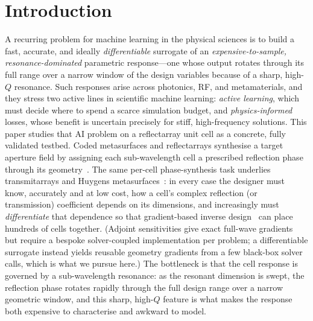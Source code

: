 \documentclass[11pt]{article}
\begin{document}
\section{Introduction}
A recurring problem for machine learning in the physical sciences is to build a fast, accurate, and
ideally \emph{differentiable} surrogate of an \emph{expensive-to-sample, resonance-dominated} parametric
response---one whose output rotates through its full range over a narrow window of the design variables
because of a sharp, high-$Q$ resonance. Such responses arise across photonics, RF, and metamaterials, and
they stress two active lines in scientific machine learning: \emph{active learning}, which must
decide where to spend a scarce simulation budget, and \emph{physics-informed} losses, whose benefit is
uncertain precisely for stiff, high-frequency solutions. This paper studies that AI problem on a
reflectarray unit cell as a concrete, fully validated testbed.
Coded metasurfaces and reflectarrays synthesise a target aperture field by assigning each sub-wavelength
cell a prescribed reflection phase through its
geometry~\cite{trentini1956,cui2014,reflectarray2022,li2021codingreflector}. The same per-cell
phase-synthesis task underlies transmitarrays and Huygens
metasurfaces~\cite{abdelrahman2015transmitarray,epstein2014huygens}: in every case the designer must
know, accurately and at low cost, how a cell's complex reflection (or transmission) coefficient depends
on its dimensions, and increasingly must \emph{differentiate} that dependence so that gradient-based
inverse design~\cite{liu2018,molesky2018} can place hundreds of cells together. (Adjoint sensitivities give
exact full-wave gradients~\cite{molesky2018} but require a bespoke solver-coupled implementation per
problem; a differentiable surrogate instead yields reusable geometry gradients from a few black-box solver
calls, which is what we pursue here.) The bottleneck is that the cell response is governed
by a sub-wavelength resonance: as the resonant dimension is swept, the reflection phase rotates rapidly
through the full design range over a narrow geometric window, and this sharp, high-$Q$
feature is what makes the response both expensive to characterise and awkward to model.
\end{document}
